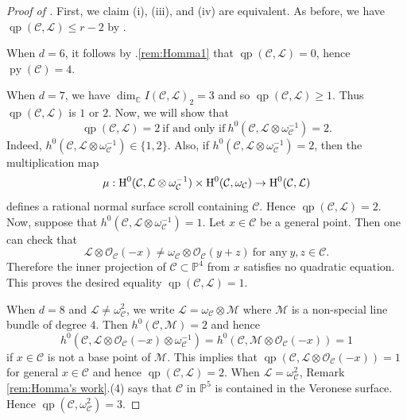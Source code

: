 \documentclass[11pt,letterpaper,reqno]{amsart}
\theoremstyle{plain}
\theoremstyle{definition}
\newtheorem{open problem}[theorem]{Open Problem}
\newtheorem{remark and notation}[theorem]{Remark and Notation}
\newtheorem{remark and definition}[theorem]{Remark and Definition}
\newtheorem{definition and notation}[theorem]{Definition and Notation}
\newtheorem{notation and convention}[theorem]{Notation and Convention}
\newtheorem{notation and remark}[theorem]{Notation and Remark}
\newtheorem{convention and notation}[theorem]{Convention and Notation}
\def \p {\mathbb{P}}
\def \H {\textnormal{H}}
\def \py {\operatorname{py}}
\def \qp {\operatorname{qp}}
\begin{document}
\begin{proof}[Proof of ]
First, we claim (i), (iii), and (iv) are equivalent.
As before, we have $\qp(\mathcal{C},\mathcal{L}) \leq r-2$ by .

When $d = 6$, it follows by .\eqref{rem:Homma1} that $\qp (\mathcal{C},\mathcal{L}) = 0$, hence $\py(\mathcal{C})=4$.

When $d=7$, we have $\dim_{\mathbb{C}} I(\mathcal{C},\mathcal{L})_2 = 3$ and so $\qp (\mathcal{C},\mathcal{L}) \geq 1$. Thus $\qp (\mathcal{C},\mathcal{L})$ is $1$ or $2$. Now, we will show that 
$$\qp (\mathcal{C},\mathcal{L}) = 2 \  \mbox{if and only if} \  h^0 (\mathcal{C},\mathcal{L} \otimes \omega_{\mathcal{C}} ^{-1}) =2.$$ 
Indeed, $h^0 (\mathcal{C},\mathcal{L} \otimes \omega_{\mathcal{C}} ^{-1}) \in \{1,2\}$. Also, if $h^0 (\mathcal{C},\mathcal{L} \otimes \omega_{\mathcal{C}} ^{-1}) =2$, then the multiplication map
\begin{equation*}\label{equ:multiplication}
\mu : \H^0 (\mathcal{C},\mathcal{L} \otimes \omega_{\mathcal{C}} ^{-1}) \times \H^0 (\mathcal{C}, \omega_{\mathcal{C}}) \rightarrow \H^0 (\mathcal{C},\mathcal{L})
\end{equation*}
defines a rational normal surface scroll containing $\mathcal{C}$. Hence $\qp (\mathcal{C},\mathcal{L}) = 2$. Now, suppose that $h^0 (\mathcal{C},\mathcal{L} \otimes \omega_{\mathcal{C}} ^{-1}) = 1$. Let $x \in \mathcal{C}$ be a general point. Then one can check that 
$$\mathcal{L} \otimes \mathcal{O}_{\mathcal{C}} (-x) \neq \omega_{\mathcal{C}} \otimes \mathcal{O}_{\mathcal{C}} (y+z) \ \mbox{for any} \ y,z \in \mathcal{C}.$$
Therefore the inner projection of $\mathcal{C} \subset \p^4$ from $x$ satisfies no quadratic equation. This proves the desired equality $\qp (\mathcal{C},\mathcal{L}) = 1$.

When $d=8$ and $\mathcal{L} \neq \omega_{\mathcal{C}} ^2$, we write $\mathcal{L} = \omega_{\mathcal{C}} \otimes \mathcal{M}$ where $\mathcal{M}$ is a non-special line bundle of degree $4$. Then $h^0 (\mathcal{C},\mathcal{M})=2$ and hence 
\begin{equation*}
h^0 (\mathcal{C},\mathcal{L} \otimes \mathcal{O}_{\mathcal{C}} (-x) \otimes \omega_{\mathcal{C}} ^{-1} ) = h^0 (\mathcal{C},\mathcal{M} \otimes \mathcal{O}_{\mathcal{C}} (-x)) = 1
\end{equation*}
if $x \in \mathcal{C}$ is not a base point of $\mathcal{M}$. 
This implies that $\qp (\mathcal{C},\mathcal{L} \otimes \mathcal{O}_{\mathcal{C}} (-x) ) = 1$ for general $x \in \mathcal{C}$ and hence $\qp (\mathcal{C},\mathcal{L}) = 2$. 
When $\mathcal{L} = \omega_{\mathcal{C}} ^2$, Remark \ref{rem:Homma's work}.(4) says that $\mathcal{C}$ in $\p^5$ is contained in the Veronese surface. 
Hence $\qp (\mathcal{C},\omega_{\mathcal{C}} ^2 ) = 3$.


\end{proof}
\end{document}
